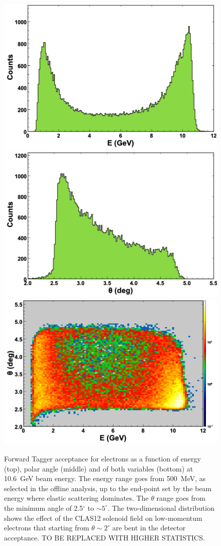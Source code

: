 \begin{figure}[ht]
\begin{center}
\includegraphics[height=0.56\columnwidth]{fig/ft_acceptance_energy.png}
\includegraphics[height=0.56\columnwidth]{fig/ft_acceptance_theta.png}
\includegraphics[height=0.56\columnwidth]{fig/ft_acceptance_energytheta.png}
\end{center}
\caption{Forward Tagger acceptance for electrons as a function of energy (top), polar angle (middle) and of both
  variables (bottom) at 10.6~GeV beam energy. The energy range goes from 500~MeV, as selected in the offline
  analysis, up to the end-point set by the beam energy where elastic scattering dominates. The $\theta$ range goes
  from the minimum angle of 2.5$^\circ$ to $\sim5^\circ$. The two-dimensional distribution shows the effect of the
  CLAS12 solenoid field on low-momentum electrons that starting from $\theta\sim2^\circ$ are bent in the detector
  acceptance. TO BE REPLACED WITH HIGHER STATISTICS.}
\label{fig:ft_acceptance}
\end{figure}

